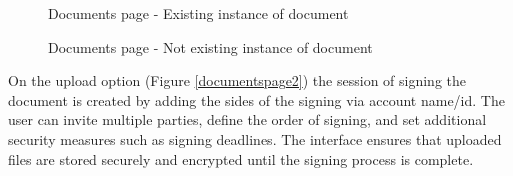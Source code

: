 \begin{figure}[H]
    \centering
    \caption{Documents page - Existing instance of document}
    \label{documents-exists}
\end{figure}

\begin{figure}[H]
    \centering
    \caption{Documents page - Not existing instance of document}
    \label{documents-noinstance}
\end{figure}

On the upload option (Figure \ref{documentspage2}) the session of signing the document is created by adding the sides of the signing via account name/id. 
The user can invite multiple parties, define the order of signing, and set additional security measures such as signing deadlines. 
The interface ensures that uploaded files are stored securely and encrypted until the signing process is complete.

